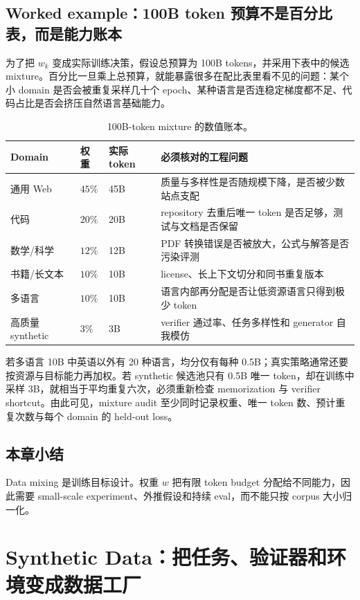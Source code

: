 \documentclass[a4paper]{article}
\begin{document}
\subsection{Worked example：100B token 预算不是百分比表，而是能力账本}

为了把 $w_k$ 变成实际训练决策，假设总预算为 100B tokens，并采用下表中的候选 mixture。百分比一旦乘上总预算，就能暴露很多在配比表里看不见的问题：某个小 domain 是否会被重复采样几十个 epoch、某种语言是否连稳定梯度都不足、代码占比是否会挤压自然语言基础能力。

\begin{table}[H]
\centering
\begin{tabular}{L{0.19\textwidth}L{0.13\textwidth}L{0.17\textwidth}L{0.35\textwidth}}
\toprule
Domain & 权重 & 实际 token & 必须核对的工程问题 \\
\midrule
通用 Web & $45\%$ & 45B & 质量与多样性是否随规模下降，是否被少数站点支配 \\
代码 & $20\%$ & 20B & repository 去重后唯一 token 是否足够，测试与文档是否保留 \\
数学/科学 & $12\%$ & 12B & PDF 转换错误是否被放大，公式与解答是否污染评测 \\
书籍/长文本 & $10\%$ & 10B & license、长上下文切分和同书重复版本 \\
多语言 & $10\%$ & 10B & 语言内部再分配是否让低资源语言只得到极少 token \\
高质量 synthetic & $3\%$ & 3B & verifier 通过率、任务多样性和 generator 自我模仿 \\
\bottomrule
\end{tabular}
\caption{100B-token mixture 的数值账本。}
\end{table}

若多语言 10B 中英语以外有 20 种语言，均分仅有每种 0.5B；真实策略通常还要按资源与目标能力再加权。若 synthetic 候选池只有 0.5B 唯一 token，却在训练中采样 3B，就相当于平均重复六次，必须重新检查 memorization 与 verifier shortcut。由此可见，mixture audit 至少同时记录权重、唯一 token 数、预计重复次数与每个 domain 的 held-out loss。

\subsection{本章小结}

Data mixing 是训练目标设计。权重 $w$ 把有限 token budget 分配给不同能力，因此需要 small-scale experiment、外推假设和持续 eval，而不能只按 corpus 大小归一化。

\section{Synthetic Data：把任务、验证器和环境变成数据工厂}
\end{document}
